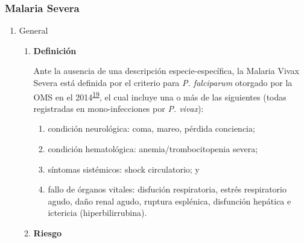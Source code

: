 \documentclass[]{article}
\providecommand{\tightlist}{%
  \setlength{\itemsep}{0pt}\setlength{\parskip}{0pt}}
\begin{document}
\subsubsection{Malaria Severa}\label{malaria-severa}

\begin{enumerate}
\def\labelenumi{\alph{enumi}.}
\item
  General

  \begin{enumerate}
  \def\labelenumii{\roman{enumii}.}
  \item
    \textbf{Definición}

    Ante la ausencia de una descripción especie-específica, la Malaria
    Vivax Severa está definida por el criterio para \emph{P. falciparum}
    otorgado por la OMS en el
    2014\textsuperscript{\protect\hyperlink{ref-WHO2014severe}{19}}, el
    cual incluye una o más de las siguientes (todas registradas en
    mono-infecciones por \emph{P. vivax}):

    \begin{enumerate}
    \def\labelenumiii{\arabic{enumiii}.}
    \tightlist
    \item
      condición neurológica: coma, mareo, pérdida conciencia;
    \item
      condición hematológica: anemia/trombocitopenia severa;
    \item
      síntomas sistémicos: shock circulatorio; y
    \item
      fallo de órganos vitales: disfución respiratoria, estrés
      respiratorio agudo, daño renal agudo, ruptura esplénica,
      disfunción hepática e ictericia (hiperbilirrubina).
    \end{enumerate}
  \item
    \textbf{Riesgo}


\end{enumerate}
\end{enumerate}
\end{document}

